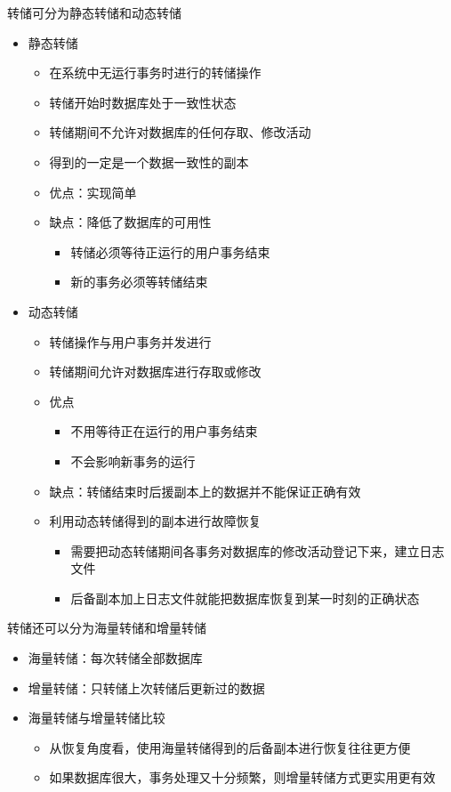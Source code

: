 转储可分为静态转储和动态转储
\begin{itemize}
    \item 静态转储
    \begin{itemize}
        \item 在系统中无运行事务时进行的转储操作
        \item 转储开始时数据库处于一致性状态
        \item 转储期间不允许对数据库的任何存取、修改活动
        \item 得到的一定是一个数据一致性的副本    
        \item 优点：实现简单  
        \item 缺点：降低了数据库的可用性
        \begin{itemize}
            \item 转储必须等待正运行的用户事务结束
            \item 新的事务必须等转储结束
        \end{itemize}
    \end{itemize}
    \item 动态转储
    \begin{itemize}
        \item 转储操作与用户事务并发进行
        \item 转储期间允许对数据库进行存取或修改
        \item 优点
        \begin{itemize}
            \item 不用等待正在运行的用户事务结束
            \item 不会影响新事务的运行
        \end{itemize}
        \item 缺点：转储结束时后援副本上的数据并不能保证正确有效
        \item 利用动态转储得到的副本进行故障恢复
        \begin{itemize}
            \item 需要把动态转储期间各事务对数据库的修改活动登记下来，建立日志文件
            \item 后备副本加上日志文件就能把数据库恢复到某一时刻的正确状态
        \end{itemize}
    \end{itemize}
\end{itemize}

转储还可以分为海量转储和增量转储
\begin{itemize}
    \item 海量转储：每次转储全部数据库
    \item 增量转储：只转储上次转储后更新过的数据
    \item 海量转储与增量转储比较
    \begin{itemize}
        \item 从恢复角度看，使用海量转储得到的后备副本进行恢复往往更方便
        \item 如果数据库很大，事务处理又十分频繁，则增量转储方式更实用更有效
    \end{itemize}
\end{itemize}

